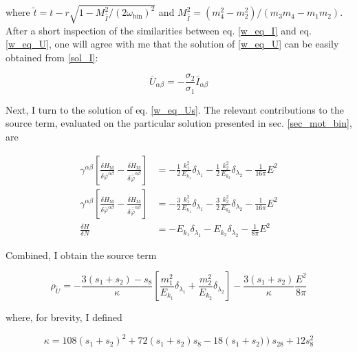 \documentclass[11pt]{article}
\begin{document}
where $\tilde t = t - r \sqrt{1 - M^2_{\hat I} / \left( 2 \omega_{\text{bin}}\right)^2 }$ and $M_{\hat I }^2  =  \left( m_4^2 - m_2^2\right) / \left( m_3 m_4 - m_1 m_2 \right) $. After a short inspection of the similarities between eq. \ref{w_eq_I} and eq. \ref{w_eq_U}, one will agree with me that the solution of \ref{w_eq_U} can be easily obtained from \ref{sol_I}:

\begin{equation}
	\bar U _{\alpha \beta} = - \frac{\sigma_2}{\sigma_1} \bar I_{\alpha \beta}
\end{equation}

Next, I turn to the solution of eq. \ref{w_eq_Us}. The relevant contributions to the source term, evaluated on the particular solution presented in sec. \ref{sec_mot_bin}, are

\begin{align}
	\gamma^{\alpha \beta} 
	\left[ 
		\frac{
			\delta H_{\text{M}}
		}{
			\delta \bar{\varphi}^{\alpha \beta}
		}
		-
		\frac{
			\delta H_{\text{M}}
		}{
			\delta \bar{\bar{\varphi}}^{\alpha \beta}
		}
	\right]
	&=
	-\frac{1}{2} \frac{k_1^2}{E_{k_1}} \delta_{\lambda_1} 
	-\frac{1}{2} \frac{k_2^2}{E_{k_2}} \delta_{\lambda_2} 
	- \frac{1}{16 \pi} E^2 \\
		\gamma^{\alpha \beta} 
	\left[ 
		\frac{
			\delta H_{\text{M}}
		}{
			\delta \bar{\varphi}^{\alpha \beta}
		}
		-
		\frac{
			\delta H_{\text{M}}
		}{
			\delta \bar{\bar{\varphi}}^{\alpha \beta}
		}
	\right]
	&=
	-\frac{3}{2} \frac{k_1^2}{E_{k_1}} \delta_{\lambda_1} 
	-\frac{3}{2} \frac{k_2^2}{E_{k_2}} \delta_{\lambda_2} 
	- \frac{1}{16 \pi} E^2 \\
	\frac{\delta H }{\delta N} 
	&= 
	- E_{k_1} \delta_{\lambda_1} 
	-E_{k_2} \delta_{\lambda_2} 
	- \frac{1}{8 \pi} E^2 
\end{align}

Combined, I obtain the source term

\begin{equation}
	\rho_{\tilde U} = 
	- \frac{3 \left( s_1 + s_2\right) - s_8 }{\kappa}
	\left[
	\frac{m_1^2}{E_{k_1}} \delta_{\lambda_1}
	+
	\frac{m_2^2}{E_{k_2}} \delta_{\lambda_2}
	\right]
	-\frac{3 \left( s_1 + s_2 \right)}{\kappa} \frac{E^2}{8 \pi}
\end{equation}

where, for brevity, I defined

\begin{equation}
	\kappa = 108 \left(s_1 + s_2 \right)^2
	+ 72 \left(s_1 + s_2 \right) s_8
	- 18 \left(s_1 + s_2)\right) s_{28}
	+ 12 s_8^2
\end{equation}
\end{document}
